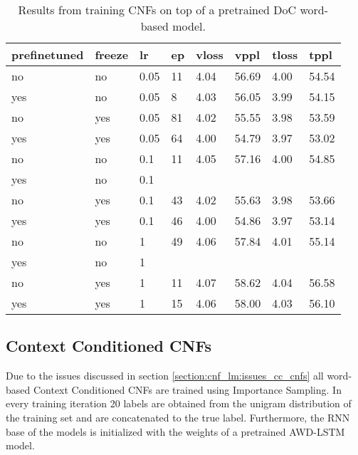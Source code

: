 \begin{table}[]
\centering
\caption{Results from training CNFs on top of a pretrained DoC word-based model.}
\begin{tabular}{|l|l|l|l|l|l|l|l|}
\hline
\textbf{prefinetuned} & \textbf{freeze} & \textbf{lr} & \textbf{ep} & \textbf{vloss} & \textbf{vppl} & \textbf{tloss} & \textbf{tppl} \\ \hline
no           & no     & 0.05 & 11 & 4.04  & 56.69 & 4.00  & 54.54 \\ \hline
yes          & no     & 0.05 & 8  & 4.03  & 56.05 & 3.99  & 54.15 \\ \hline
no           & yes    & 0.05 & 81 & 4.02  & 55.55 & 3.98  & 53.59 \\ \hline
yes          & yes    & 0.05 & 64 & 4.00  & 54.79 & 3.97  & 53.02 \\ \hline
no           & no     & 0.1  & 11 & 4.05  & 57.16 & 4.00  & 54.85 \\ \hline
yes          & no     & 0.1  &    &       &       &       &       \\ \hline
no           & yes    & 0.1  & 43 & 4.02  & 55.63 & 3.98  & 53.66 \\ \hline
yes          & yes    & 0.1  & 46 & 4.00  & 54.86 & 3.97  & 53.14 \\ \hline
no           & no     & 1    & 49 & 4.06  & 57.84 & 4.01  & 55.14 \\ \hline
yes          & no     & 1    &    &       &       &       &       \\ \hline
no           & yes    & 1    & 11 & 4.07  & 58.62 & 4.04  & 56.58 \\ \hline
yes          & yes    & 1    & 15 & 4.06  & 58.00 & 4.03  & 56.10 \\ \hline
\end{tabular}
\end{table}

\subsection{Context Conditioned CNFs}

Due to the issues discussed in section \ref{section:cnf_lm:issues_cc_cnfs} all word-based Context Conditioned CNFs are trained using Importance Sampling. In every training iteration 20 labels are obtained from the unigram distribution of the training set and are concatenated to the true label. Furthermore, the RNN base of the models is initialized with the weights of a pretrained AWD-LSTM model.

